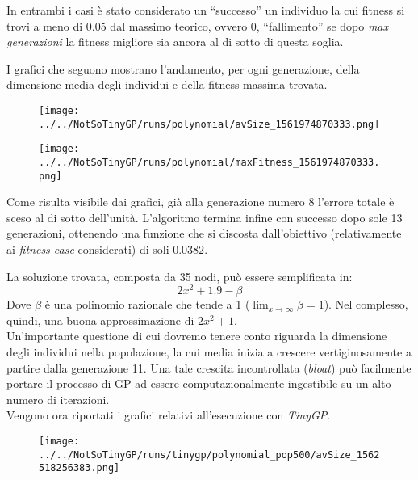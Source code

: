 \documentclass{../llncs}
\newcommand{\labelfig}[1]{\label{fig:#1}}
\begin{document}
In entrambi i casi è stato considerato un ``successo'' un individuo la cui fitness si trovi a meno di 0.05 dal massimo teorico, ovvero 0, ``fallimento'' se dopo \emph{max generazioni} la fitness migliore sia ancora al di sotto di questa soglia.

I grafici che seguono mostrano l'andamento, per ogni generazione, della dimensione %
media degli individui e della fitness massima trovata.


\begin{figure}[!htb]
\centering
\texttt{[image: ../../NotSoTinyGP/runs/polynomial/avSize\_1561974870333.png]}
\end{figure}

\begin{figure}[!htb]
\centering
\texttt{[image: ../../NotSoTinyGP/runs/polynomial/maxFitness\_1561974870333.png]}
\end{figure}

Come risulta visibile dai grafici, già alla generazione numero 8 l'errore totale è sceso al di sotto dell'unità.
L'algoritmo termina infine con successo dopo sole 13 generazioni, ottenendo una funzione che si discosta dall'obiettivo (relativamente ai \emph{fitness case} considerati) di soli $0.0382$. 

\noindent La soluzione trovata, composta da 35 nodi, può essere semplificata in:
\[
2x^2 + 1.9 - \beta
\]
Dove $\beta$ è una polinomio razionale che tende a 1 ($\lim_{x \to \infty} \beta = 1$). Nel complesso, quindi, una buona approssimazione di $2x^2+1$.\\

Un'importante questione di cui dovremo tenere conto riguarda la dimensione degli individui nella popolazione, la cui media inizia a crescere vertiginosamente a partire dalla generazione 11. Una tale crescita incontrollata (\emph{bloat}) può facilmente portare il processo di GP ad essere computazionalmente ingestibile su un alto numero di iterazioni.\\

\noindent Vengono ora riportati i grafici relativi all'esecuzione con \emph{TinyGP}.

\begin{figure}[!htb]
\centering
\texttt{[image: ../../NotSoTinyGP/runs/tinygp/polynomial\_pop500/avSize\_1562518256383.png]}
\end{figure}
\end{document}
